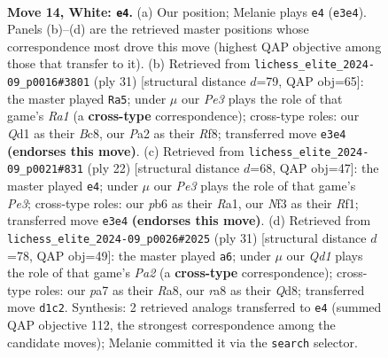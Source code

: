 \documentclass[11pt]{article}
\begin{document}
\clearpage

\begin{figure}[p]\centering
\begin{subfigure}{0.46\textwidth}\centering
\resizebox{\linewidth}{!}{%
\newchessgame
\chessboard[
  setfen={rr4k1/p1pbqppp/1pn1pn2/8/2BP3P/4PNP1/PP1B1P2/R2QR1K1 w - - 0 14},
  showmover=false,
  pgfstyle=straightmove, color=movearrow, markmove={e3-e4}
]}
\caption{}
\end{subfigure}\hfill
\begin{subfigure}{0.46\textwidth}\centering
\resizebox{\linewidth}{!}{%
\newchessgame
\chessboard[
  setfen={r1b2rk1/1p1nqpp1/2n1p2p/2P5/p2pN3/3P1NP1/PPQ2PBP/2R1R1K1 b - - 4 16},
  showmover=false,
  pgfstyle=straightmove, color=movearrow, markmove={a8-a5}
]}
\caption{}
\end{subfigure}
\\[4pt]
\begin{subfigure}{0.46\textwidth}\centering
\resizebox{\linewidth}{!}{%
\newchessgame
\chessboard[
  setfen={r4rk1/pbp1qppp/1pn1pn2/8/2BP4/P1P1PP2/4N1PP/R1BQ1RK1 w - - 1 12},
  showmover=false,
  pgfstyle=straightmove, color=movearrow, markmove={e3-e4}
]}
\caption{}
\end{subfigure}\hfill
\begin{subfigure}{0.46\textwidth}\centering
\resizebox{\linewidth}{!}{%
\newchessgame
\chessboard[
  setfen={r2qr1k1/pb2bppp/1p1p1n2/2pP4/P1P2P2/2NQ2NP/1P4P1/R1B2RK1 b - - 0 16},
  showmover=false,
  pgfstyle=straightmove, color=movearrow, markmove={a7-a6}
]}
\caption{}
\end{subfigure}
\caption{\textbf{Move 14, White: \texttt{e4}.} (a) Our position; Melanie plays \texttt{e4} (\texttt{e3e4}). Panels (b)--(d) are the retrieved master positions whose correspondence most drove this move (highest QAP objective among those that transfer to it). (b) Retrieved from \texttt{lichess\_elite\_2024-09\_p0016\#3801} (ply 31) [structural distance $d$=79, QAP obj=65]: the master played \texttt{Ra5}; under $\mu$ our \emph{Pe3} plays the role of that game's \emph{Ra1} (a \textbf{cross-type} correspondence); cross-type roles: our \emph{Q}d1 as their \emph{B}c8, our \emph{P}a2 as their \emph{R}f8; transferred move \texttt{e3e4} \textbf{(endorses this move)}. (c) Retrieved from \texttt{lichess\_elite\_2024-09\_p0021\#831} (ply 22) [structural distance $d$=68, QAP obj=47]: the master played \texttt{e4}; under $\mu$ our \emph{Pe3} plays the role of that game's \emph{Pe3}; cross-type roles: our \emph{p}b6 as their \emph{R}a1, our \emph{N}f3 as their \emph{R}f1; transferred move \texttt{e3e4} \textbf{(endorses this move)}. (d) Retrieved from \texttt{lichess\_elite\_2024-09\_p0026\#2025} (ply 31) [structural distance $d$=78, QAP obj=49]: the master played \texttt{a6}; under $\mu$ our \emph{Qd1} plays the role of that game's \emph{Pa2} (a \textbf{cross-type} correspondence); cross-type roles: our \emph{p}a7 as their \emph{R}a8, our \emph{r}a8 as their \emph{Q}d8; transferred move \texttt{d1c2}. Synthesis: 2 retrieved analogs transferred to \texttt{e4} (summed QAP objective 112, the strongest correspondence among the candidate moves); Melanie committed it via the \texttt{search} selector.}
\label{fig:thought-m26}
\end{figure}
\end{document}
